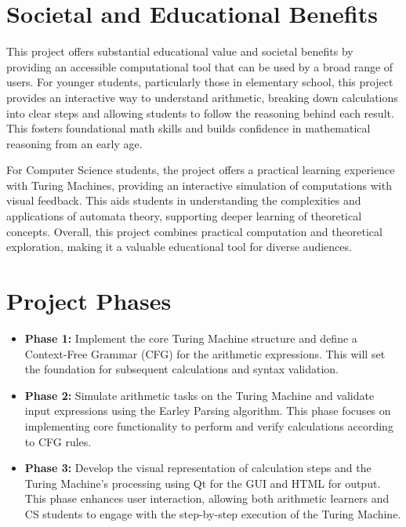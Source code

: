 \documentclass[a4paper,12pt]{article}
\begin{document}
\newpage

\section*{Societal and Educational Benefits}

This project offers substantial educational value and societal benefits by providing an accessible computational tool that can be used by a broad range of users. For younger students, particularly those in elementary school, this project provides an interactive way to understand arithmetic, breaking down calculations into clear steps and allowing students to follow the reasoning behind each result. This fosters foundational math skills and builds confidence in mathematical reasoning from an early age.

For Computer Science students, the project offers a practical learning experience with Turing Machines, providing an interactive simulation of computations with visual feedback. This aids students in understanding the complexities and applications of automata theory, supporting deeper learning of theoretical concepts. Overall, this project combines practical computation and theoretical exploration, making it a valuable educational tool for diverse audiences.

\section*{Project Phases}

\begin{itemize}
    \item \textbf{Phase 1:} Implement the core Turing Machine structure and define a Context-Free Grammar (CFG) for the arithmetic expressions. This will set the foundation for subsequent calculations and syntax validation.
    
    \item \textbf{Phase 2:} Simulate arithmetic tasks on the Turing Machine and validate input expressions using the Earley Parsing algorithm. This phase focuses on implementing core functionality to perform and verify calculations according to CFG rules.
    
    \item \textbf{Phase 3:} Develop the visual representation of calculation steps and the Turing Machine's processing using Qt for the GUI and HTML for output. This phase enhances user interaction, allowing both arithmetic learners and CS students to engage with the step-by-step execution of the Turing Machine.
\end{itemize}
\end{document}
